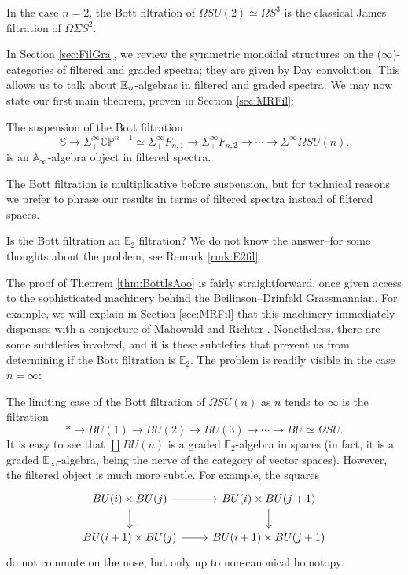 \begin{exm}
In the case $n=2$, the Bott filtration of $\Omega SU(2) \simeq \Omega S^3$ is the classical James filtration of $\Omega \Sigma S^2$.
\end{exm}

In Section \ref{sec:FilGra}, we review the symmetric monoidal structures on the ($\infty$)-categories of filtered and graded spectra; they are given by Day convolution.  This allows us to talk about $\operatorname{\mathbb{E}}_n$-algebras in filtered and graded spectra.  We may now state our first main theorem, proven in Section \ref{sec:MRFil}:

\begin{thm} \label{thm:BottIsAoo}
The suspension of the Bott filtration 
$$\mathbb{S} \longrightarrow \Sigma_+^{\infty} \mathbb{CP}^{n-1} \simeq \Sigma_+^{\infty} F_{n,1} \longrightarrow \Sigma_+^{\infty} F_{n,2} \longrightarrow \cdots \longrightarrow \Sigma^{\infty}_+ \Omega SU(n).$$
is an $\mathbb{A}_\infty$-algebra object in filtered spectra.
\end{thm}

\begin{rmk}
The Bott filtration is multiplicative before suspension, but for technical reasons we prefer to phrase our results in terms of filtered spectra instead of filtered spaces.
\end{rmk}

\begin{qst} \label{qst:BottE2}
Is the Bott filtration an $\mathbb{E}_2$ filtration?  We do not know the answer--for some thoughts about the problem, see Remark \ref{rmk:E2fil}.
\end{qst}

The proof of Theorem \ref{thm:BottIsAoo} is fairly straightforward, once given access to the sophisticated machinery behind the Beilinson--Drinfeld Grassmannian.  For example, we will explain in Section \ref{sec:MRFil} that this machinery immediately dispenses with a conjecture of Mahowald and Richter \cite{MahowaldRichter}.  Nonetheless, there are some subtleties involved, and it is these subtleties that prevent us from determining if the Bott filtration is $\mathbb{E}_2$.  The problem is readily visible in the case $n=\infty$:

\begin{exm}\label{exm:BottFil}
The limiting case of the Bott filtration of $\Omega SU(n)$ as $n$ tends to $\infty$ is the filtration
$$* \longrightarrow BU(1) \longrightarrow BU(2) \longrightarrow BU(3) \longrightarrow \cdots \longrightarrow BU \simeq \Omega SU.$$
It is easy to see that $\coprod BU(n)$ is a graded $\mathbb{E}_2$-algebra in spaces (in fact, it is a graded $\mathbb{E}_\infty$-algebra, being the nerve of the category of vector spaces).  However, the filtered object is much more subtle.  For example, the squares
$$
\begin{tikzcd}
BU(i) \times BU(j) \arrow{d} \arrow{r} & BU(i) \times BU(j+1) \arrow{d} \\
BU(i+1) \times BU(j) \arrow{r} & BU(i+1) \times BU(j+1)
\end{tikzcd}
$$
do not commute on the nose, but only up to non-canonical homotopy.
\end{exm}

